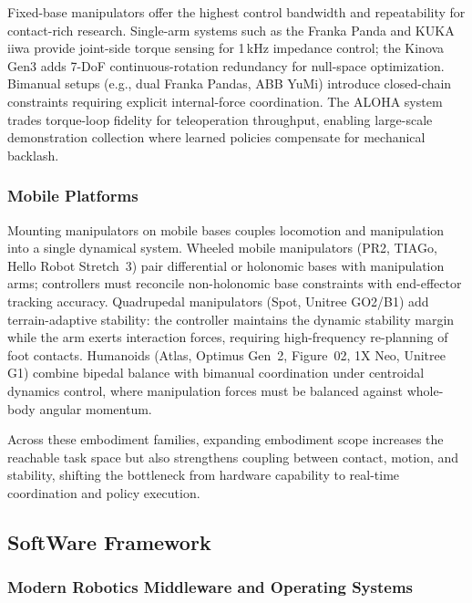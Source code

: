 \documentclass[acmsmall,screen,review,anonymous]{acmart}
\begin{document}
Fixed-base manipulators offer the highest control bandwidth and repeatability for contact-rich research. Single-arm systems such as the Franka Panda and KUKA iiwa provide joint-side torque sensing for 1\,kHz impedance control; the Kinova Gen3 adds 7-DoF continuous-rotation redundancy for null-space optimization. Bimanual setups (e.g., dual Franka Pandas, ABB YuMi) introduce closed-chain constraints requiring explicit internal-force coordination. The ALOHA system~\cite{zhao2023learning} trades torque-loop fidelity for teleoperation throughput, enabling large-scale demonstration collection where learned policies compensate for mechanical backlash.

\subsubsection{Mobile Platforms}\label{subsec:mobile_platforms}

Mounting manipulators on mobile bases couples locomotion and manipulation into a single dynamical system. Wheeled mobile manipulators (PR2, TIAGo, Hello Robot Stretch~3) pair differential or holonomic bases with manipulation arms; controllers must reconcile non-holonomic base constraints with end-effector tracking accuracy. Quadrupedal manipulators (Spot, Unitree GO2/B1) add terrain-adaptive stability: the controller maintains the dynamic stability margin while the arm exerts interaction forces, requiring high-frequency re-planning of foot contacts. Humanoids (Atlas, Optimus Gen~2, Figure~02, 1X Neo, Unitree G1) combine bipedal balance with bimanual coordination under centroidal dynamics control, where manipulation forces must be balanced against whole-body angular momentum.

Across these embodiment families, expanding embodiment scope increases the reachable task space but also strengthens coupling between contact, motion, and stability, shifting the bottleneck from hardware capability to real-time coordination and policy execution.

\subsection{SoftWare Framework}

\subsubsection{Modern Robotics Middleware and Operating Systems}\label{subsec:control_middleware}
\end{document}
